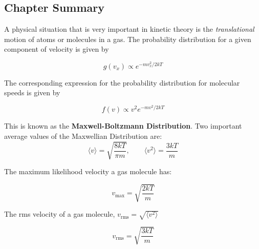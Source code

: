 \documentclass[svgnames]{article}     %
\begin{document}
\subsection{Chapter Summary}

A physical situation that is very important in kinetic theory is the
\textit{translational} motion of atoms or molecules in a gas. The probability
distribution for a given component of velocity is given by 

\[
  g(v_x) \propto e^{-mv_x^2 / 2kT}
\] \vspace{5px}

The corresponding expression for the probability distribution for molecular
speeds is given by 

\[
  f(v) \propto v^2e^{-mv^2 / 2kT}
\] \vspace{5px}

This is known as the \textbf{Maxwell-Boltzmann Distribution}. Two important
average values of the Maxwellian Distribution are: 
 \[
\langle v \rangle = \sqrt{\frac{8kT}{\pi m}}, \qquad \langle v^2 \rangle
= \frac{3kT}{m}
\] \vspace{5px}

The maximum likelihood velocity a gas molecule has: 

\[
  v_\text{max} = \sqrt{\frac{2kT}{m}}
\] \vspace{5px}

The rms velocity of a gas molecule, $v_\text{rms} = \sqrt{\langle v^2 \rangle}$ 

\[
  v_\text{rms} = \sqrt{\frac{3kT}{m}}
\] \vspace{5px}
\end{document}
